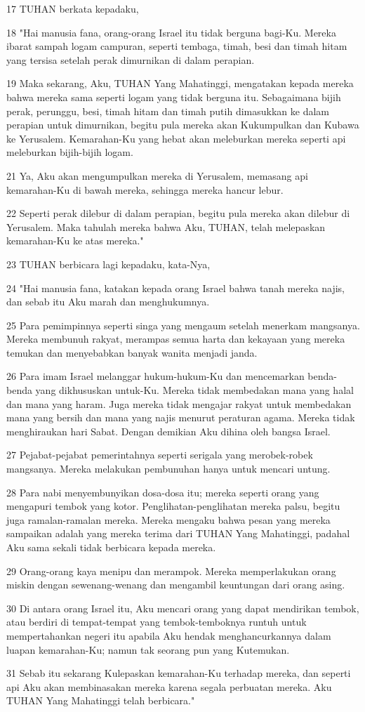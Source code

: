 \par 17 TUHAN berkata kepadaku,
\par 18 "Hai manusia fana, orang-orang Israel itu tidak berguna bagi-Ku. Mereka ibarat sampah logam campuran, seperti tembaga, timah, besi dan timah hitam yang tersisa setelah perak dimurnikan di dalam perapian.
\par 19 Maka sekarang, Aku, TUHAN Yang Mahatinggi, mengatakan kepada mereka bahwa mereka sama seperti logam yang tidak berguna itu. Sebagaimana bijih perak, perunggu, besi, timah hitam dan timah putih dimasukkan ke dalam perapian untuk dimurnikan, begitu pula mereka akan Kukumpulkan dan Kubawa ke Yerusalem. Kemarahan-Ku yang hebat akan meleburkan mereka seperti api meleburkan bijih-bijih logam.
\par 21 Ya, Aku akan mengumpulkan mereka di Yerusalem, memasang api kemarahan-Ku di bawah mereka, sehingga mereka hancur lebur.
\par 22 Seperti perak dilebur di dalam perapian, begitu pula mereka akan dilebur di Yerusalem. Maka tahulah mereka bahwa Aku, TUHAN, telah melepaskan kemarahan-Ku ke atas mereka."
\par 23 TUHAN berbicara lagi kepadaku, kata-Nya,
\par 24 "Hai manusia fana, katakan kepada orang Israel bahwa tanah mereka najis, dan sebab itu Aku marah dan menghukumnya.
\par 25 Para pemimpinnya seperti singa yang mengaum setelah menerkam mangsanya. Mereka membunuh rakyat, merampas semua harta dan kekayaan yang mereka temukan dan menyebabkan banyak wanita menjadi janda.
\par 26 Para imam Israel melanggar hukum-hukum-Ku dan mencemarkan benda-benda yang dikhususkan untuk-Ku. Mereka tidak membedakan mana yang halal dan mana yang haram. Juga mereka tidak mengajar rakyat untuk membedakan mana yang bersih dan mana yang najis menurut peraturan agama. Mereka tidak menghiraukan hari Sabat. Dengan demikian Aku dihina oleh bangsa Israel.
\par 27 Pejabat-pejabat pemerintahnya seperti serigala yang merobek-robek mangsanya. Mereka melakukan pembunuhan hanya untuk mencari untung.
\par 28 Para nabi menyembunyikan dosa-dosa itu; mereka seperti orang yang mengapuri tembok yang kotor. Penglihatan-penglihatan mereka palsu, begitu juga ramalan-ramalan mereka. Mereka mengaku bahwa pesan yang mereka sampaikan adalah yang mereka terima dari TUHAN Yang Mahatinggi, padahal Aku sama sekali tidak berbicara kepada mereka.
\par 29 Orang-orang kaya menipu dan merampok. Mereka memperlakukan orang miskin dengan sewenang-wenang dan mengambil keuntungan dari orang asing.
\par 30 Di antara orang Israel itu, Aku mencari orang yang dapat mendirikan tembok, atau berdiri di tempat-tempat yang tembok-temboknya runtuh untuk mempertahankan negeri itu apabila Aku hendak menghancurkannya dalam luapan kemarahan-Ku; namun tak seorang pun yang Kutemukan.
\par 31 Sebab itu sekarang Kulepaskan kemarahan-Ku terhadap mereka, dan seperti api Aku akan membinasakan mereka karena segala perbuatan mereka. Aku TUHAN Yang Mahatinggi telah berbicara."

